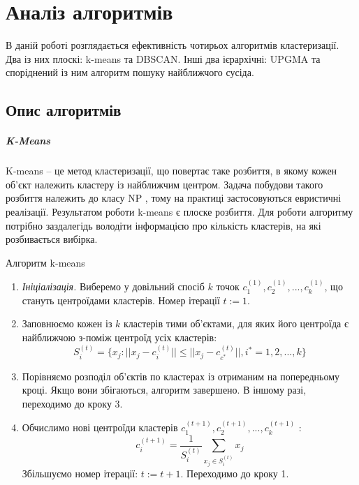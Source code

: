 \chapter {Аналіз алгоритмів}

    В даній роботі розглядається ефективність чотирьох алгоритмів кластеризації. Два із них плоскі: k-means та DBSCAN. Інші два ієрархічні: UPGMA та споріднений із ним алгоритм пошуку найближчого сусіда.

\section {Опис алгоритмів}
    \paragraph {K-Means}
        K-means -- це метод кластеризації, що повертає таке розбиття, в якому кожен об'єкт належить кластеру із найближчим центром. Задача побудови такого розбиття належить до класу NP \cite{KmeansNpHard}, тому на практиці застосовуються евристичні реалізації.
        Результатом роботи k-means є плоске розбиття. Для роботи алгоритму потрібно заздалегідь володіти інформацією про кількість кластерів, на які розбивається вибірка.
        \begin{algorithm}
            \caption {Алгоритм k-means}
            \begin{enumerate}
                \item[ ] \emph {Ініціалізація.}
                    Виберемо у довільний спосіб $k$ точок $c_1^{(1)}, c_2^{(1)}, ..., c_k^{(1)}$, що стануть центроїдами кластерів. Номер ітерації $t := 1$.
                \item
                    Заповнюємо кожен із $k$ кластерів тими об'єктами, для яких його центроїда є найближчою з-поміж центроїд усіх кластерів:
                    \[
                        S_i^{(t)} = \{x_j : ||x_j - c_i^{(t)}|| \leq ||x_j - c_{c^*}^{(t)}||, 
                        i^* = 1, 2, ..., k\}
                    \]
                \item
                    Порівняємо розподіл об'єктів по кластерах із отриманим на попередньому кроці.
                    Якщо вони збігаються, алгоритм завершено. В іншому разі, переходимо до кроку 3.
                \item
                    Обчислимо нові центроїди кластерів $c_1^{(t+1)}, c_2^{(t+1)}, ..., c_k^{(t+1)}$ :
                    \[
                        c_i^{(t+1)} = \frac{1} {S_i^{(t)}} \sum_{x_j \in S_i^{(t)}} x_j
                    \]
                    Збільшуємо номер ітерації: $t := t + 1$.
                    Переходимо до кроку 1.                        
            \end{enumerate}
        \end{algorithm}
        
